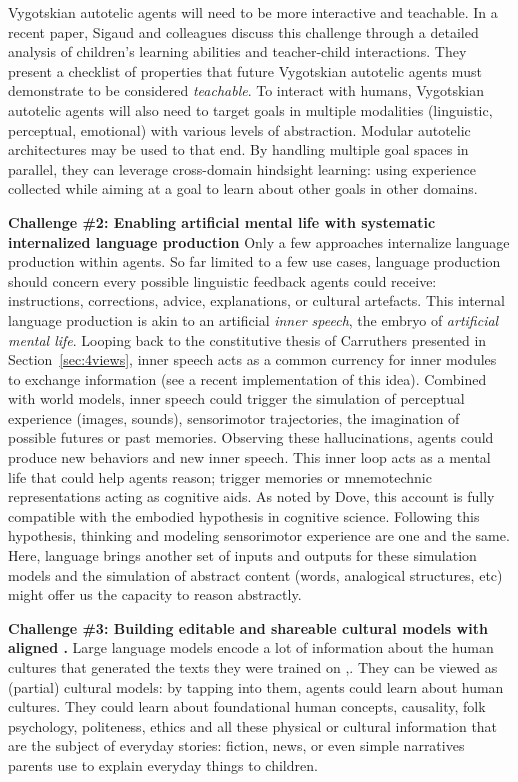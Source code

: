 Vygotskian autotelic agents will need to be more interactive and teachable. In a recent paper, Sigaud and colleagues discuss this challenge through a detailed analysis of children's learning abilities and teacher-child interactions.\cite{sigaud_towards_2021} They present a checklist of properties that future Vygotskian autotelic agents must demonstrate to be considered \textit{teachable}. To interact with humans, Vygotskian autotelic agents will also need to target goals in multiple modalities (\eg linguistic, perceptual, emotional) with various levels of abstraction.\cite{colas2021intrinsically} Modular autotelic architectures may be used to that end. By handling multiple goal spaces in parallel, they can leverage cross-domain hindsight learning: using experience collected while aiming at a goal to learn about other goals in other domains.\cite{curious} 

\textbf{Challenge \#2: Enabling artificial mental life with systematic internalized language production}
Only a few approaches internalize language production within agents. So far limited to a few use cases, language production should concern every possible linguistic feedback agents could receive: instructions, corrections, advice, explanations, or cultural artefacts. This internal language production is akin to an artificial \textit{inner speech}, the embryo of \textit{artificial mental life}. Looping back to the constitutive thesis of Carruthers presented in Section~\ref{sec:4views}, inner speech acts as a common currency for inner modules to exchange information (see a recent implementation of this idea\cite{zeng2022socratic}). Combined with world models, inner speech could trigger the simulation of perceptual experience (images, sounds), sensorimotor trajectories, the imagination of possible futures or past memories. Observing these hallucinations, agents could produce new behaviors and new inner speech. This inner loop acts as a mental life that could help agents reason; trigger memories or mnemotechnic representations acting as cognitive aids. As noted by Dove, this account is fully compatible with the embodied hypothesis in cognitive science.\cite{dove_language_2018} Following this hypothesis, thinking and modeling sensorimotor experience are one and the same. Here, language brings another set of inputs and outputs for these simulation models and the simulation of abstract content (words, analogical structures, etc) might offer us the capacity to reason abstractly.  

\textbf{Challenge \#3: Building editable and shareable cultural models with aligned \llms.} 
Large language models encode a lot of information about the human cultures that generated the texts they were trained on \llms,\cite{west_symbolic_2021,schramowski2022large}. They can be viewed as (partial) cultural models: by tapping into them, agents could learn about human cultures. They could learn about foundational human concepts, causality, folk psychology, politeness, ethics and all these physical or cultural information that are the subject of everyday stories: fiction, news, or even simple narratives parents use to explain everyday things to children. 

